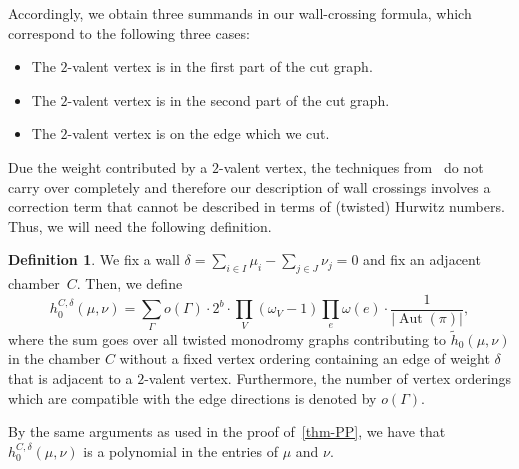 \documentclass[10pt]{amsart}
\theoremstyle{plain}
\theoremstyle{definition}
\newtheorem{defi}[defi]{Definition}
\theoremstyle{definition}
\theoremstyle{plain}
\theoremstyle{plain}
\theoremstyle{remark}
\theoremstyle{plain}
\theoremstyle{plain}
\DeclareMathOperator{\Aut}{Aut}
\begin{document}
Accordingly, we obtain three summands in our wall-crossing formula, which correspond to the following three cases:

\begin{itemize}
    \item The $2$-valent vertex is in the first part of the cut graph.
    \item The $2$-valent vertex is in the second part of the cut graph.
    \item The $2$-valent vertex is on the edge which we cut.
\end{itemize}

Due the weight contributed by a $2$-valent vertex, the techniques from~\cite{CJM10} do not carry over completely and therefore our description of wall crossings involves a correction term that cannot be described in terms of (twisted) Hurwitz numbers. Thus, we will need the following definition.

\begin{defi}
We fix a wall $\delta=\sum_{i\in I}\mu_i - \sum_{j\in J}\nu_j=0$ and fix an adjacent chamber~$C$. Then, we define 
\begin{equation*}
    h_0^{C,\delta}(\mu,\nu)=\sum_{\Gamma} o(\Gamma) \cdot 2^{b}\cdot \prod_V (\omega_V-1)\prod_e\omega(e)\cdot \frac{1}{|\Aut(\pi)|},
\end{equation*}
where  the sum goes over all twisted monodromy graphs contributing to $\tilde{h}_0(\mu,\nu)$ in the chamber $C$ without a fixed vertex ordering containing an edge of weight $\delta$ that is adjacent to a $2$-valent vertex. Furthermore, the number of vertex orderings which are compatible with the edge directions is denoted by $o(\Gamma)$.
\end{defi}

By the same arguments as used in the proof of~\cref{thm-PP}, we have that $h_0^{C,\delta}(\mu,\nu)$ is a polynomial in the entries of $\mu$ and $\nu$.
\end{document}
